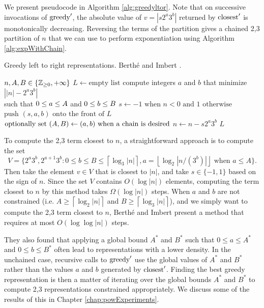 \documentclass{ucalgthes1}
\theoremstyle{definition}
\newcommand{\ZZgez}{\mathbb{Z}_{\ge 0}}
\newcommand{\floor}[1]{\left\lfloor #1 \right\rfloor}
\newcommand{\ceil}[1]{\left\lceil #1 \right\rceil}
\begin{document}
\noindent
We present pseudocode in Algorithm \ref{alg:greedyltor}. Note that on successive invocations of $\textrm{greedy}'$, the absolute value of $v=|s2^a3^b|$ returned by $\textrm{closest}'$ is monotonically decreasing.  Reversing the terms of the partition gives a chained 2,3 partition of $n$ that we can use to perform exponentiation using Algorithm \ref{alg:expWithChain}.

\begin{algorithm}[h]
\caption{Greedy left to right representations. Berth{\'e} and Imbert \cite{Berthe2009}.}
\label{alg:greedyltor}
\begin{algorithmic}[1]
\REQUIRE $n, \amax, \bmax \in \{\ZZgez, +\infty\}$ 
\STATE $L \gets \textrm{empty list}$
	\STATE compute integers $a$ and $b$ that minimize $\left||n| - 2^a3^b \right|$ \\
	       such that $0 \le a \le A$ and $0 \le b \le B$
	\STATE $s \gets -1 \textrm{ when } n < 0 \textrm{ and } 1 \textrm{ otherwise}$
	\STATE $\textrm{push }(s, a, b) \textrm{ onto the front of } L$
	\STATE $\textrm{optionally set } (A, B) \gets (a, b) \textrm{ when a chain is desired}$
	\STATE $n \gets n - s2^a3^b$
\ENDWHILE
\RETURN $L$
\end{algorithmic}
\end{algorithm}

To compute the 2,3 term closest to $n$, a straightforward approach is to compute the set 
\[
V = \{2^a3^b, 2^{a+1}3^b : 0 \le b \le B \le \ceil{\log_3|n|}, a=\floor{\log_2|n/(3^b)|} \textrm{ when } a \le A\}.
\]
Then take the element $v \in V$ that is closest to $|n|$, and take $s \in \{-1, 1\}$ based on the sign of $n$. Since the set $V$ contains $O(\log |n|)$ elements, computing the term closest to $n$ by this method takes $\Omega(\log |n|)$ steps.  When $a$ and $b$ are not constrained (i.e. $A \ge \ceil{\log_2|n|}$ and $B \ge \ceil{\log_3|n|}$), and we simply want to compute the 2,3 term closest to $n$, Berth\'{e} and Imbert \cite{Berthe2009} present a method that requires at most $O(\log \log |n|)$ steps. 

They also found that applying a global bound $A^*$ and $B^*$ such that $0 \le a \le A^*$ and $0 \le b \le B^*$ often lead to representations with a lower density.  In the unchained case, recursive calls to $\textrm{greedy}'$ use the global values of $A^*$ and $B^*$ rather than the values $a$ and $b$ generated by $\textrm{closest}'$.  Finding the best greedy representation is then a matter of iterating over the global bounds $A^*$ and $B^*$ to compute 2,3 representations constrained appropriately.  We discuss some of the results of this in Chapter \ref{chap:powExperiments}.
\end{document}
